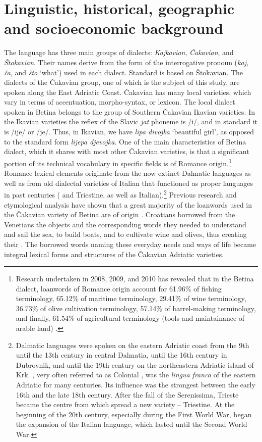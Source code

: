 \documentclass[output=paper]{LSP/langsci}
\begin{document}
\section{Linguistic, historical, geographic and socioeconomic background}
The  language has three main groups of dialects: \textit{Kajkavian}, \textit{Čakavian}, and \textit{Štokavian}. Their names derive from the form of the interrogative pronoun (\textit{kaj}, \textit{ča}, and \textit{što} ‘what’) used in each dialect. Standard  is based on Štokavian. The dialects of the Čakavian group, one of which is the subject of this study, are spoken along the East Adriatic Coast. Čakavian has many local varieties, which vary in terms of accentuation, morpho-syntax, or lexicon. The local dialect spoken in Betina belongs to the group of Southern Čakavian Ikavian varieties. In the Ikavian varieties the reflex of the Slavic \textit{jat} phoneme is /i/, and in  standard  it is /ije/ or /je/. Thus, in Ikavian, we have \textit{lipa divojka} `beautiful girl', as opposed to the  standard form \textit{lijepa djevojka}. One of the main characteristics of Betina dialect, which it shares with most other Čakavian varieties, is that a significant portion of its technical vocabulary in specific fields is of Romance origin.\footnote{Research undertaken in 2008, 2009, and 2010 has revealed that in the Betina dialect, loanwords of Romance origin account for 61.96\% of fishing terminology, 65.12\% of maritime terminology, 29.41\% of wine terminology, 36.73\% of olive cultivation terminology, 57.14\% of barrel-making terminology, and finally, 61.54\% of agricultural terminology (tools and maintainance of arable land) \citep[254--255]{skevin_etimoloska_2010}.} Romance lexical elements originate from the now extinct Dalmatic languages as well as from old dialectal varieties of Italian that functioned as proper languages in past centuries ( and Triestine, as well as Italian).\footnote{ Dalmatic languages were spoken on the eastern Adriatic coast from the 9th until the 13th century in central Dalmatia, until the 16th century in Dubrovnik, and until the 19th century on the northeastern Adriatic island of Krk. , very often referred to as Colonial , was the \textit{lingua franca }of the eastern Adriatic for many centuries. Its influence was the strongest between the early 16th and the late 18th century. After the fall of the Serenissima, Trieste became the centre from which spread a new  variety – Triestine. At the beginning of the 20th century, especially during the First World War, began the expansion of the Italian language, which lasted until the Second World War.} Previous research and etymological analysis have shown that a great majority of the loanwords used in the Čakavian variety of Betina are of  origin \citep{filipi_betinska_1997,skevin_etimoloska_2010}. Croatians borrowed from the Venetians the objects and the corresponding words they needed to understand and sail the sea, to build boats, and to cultivate wine and olives, thus creating their . The borrowed words naming these everyday needs and ways of life became integral lexical forms and structures of the Čakavian  Adriatic varieties.
\end{document}
